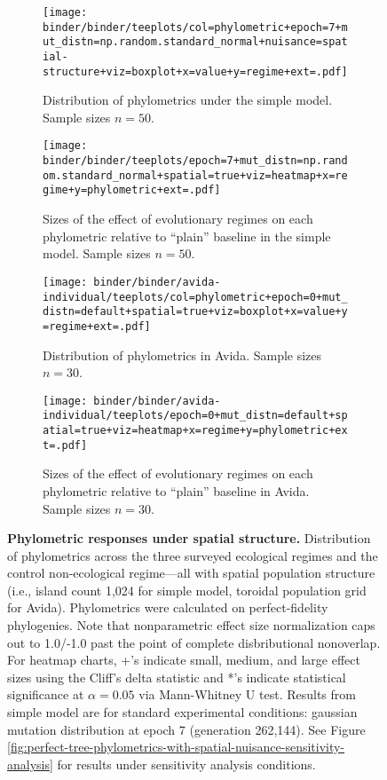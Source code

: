 \begin{figure*}
  \centering
\begin{subfigure}[b]{\textwidth}
  \texttt{[image: binder/binder/teeplots/col=phylometric+epoch=7+mut\_distn=np.random.standard\_normal+nuisance=spatial-structure+viz=boxplot+x=value+y=regime+ext=.pdf]}
  \caption{ Distribution of phylometrics under the simple model.
    Sample sizes $n=50$.}
\end{subfigure}

\begin{subfigure}[b]{\textwidth}
  \texttt{[image: binder/binder/teeplots/epoch=7+mut\_distn=np.random.standard\_normal+spatial=true+viz=heatmap+x=regime+y=phylometric+ext=.pdf]}
  \caption{Sizes of the effect of evolutionary regimes on each phylometric relative to ``plain'' baseline in the simple model.
    Sample sizes $n=50$.}
\end{subfigure}

\begin{subfigure}[b]{\textwidth}
  \texttt{[image: binder/binder/avida-individual/teeplots/col=phylometric+epoch=0+mut\_distn=default+spatial=true+viz=boxplot+x=value+y=regime+ext=.pdf]}
  \caption{ Distribution of phylometrics in Avida.
  Sample sizes $n=30$.}
\end{subfigure}%

\begin{subfigure}[b]{\textwidth}
  \texttt{[image: binder/binder/avida-individual/teeplots/epoch=0+mut\_distn=default+spatial=true+viz=heatmap+x=regime+y=phylometric+ext=.pdf]}
\caption{%
Sizes of the effect of evolutionary regimes on each phylometric relative to ``plain'' baseline in Avida.
    Sample sizes $n=30$.
}
\end{subfigure}
\vspace{1cm}


  \caption{%
    \textbf{Phylometric responses under spatial structure.}
    Distribution of phylometrics across the three surveyed ecological regimes and the control non-ecological regime---all with spatial population structure (i.e., island count 1,024 for simple model, toroidal population grid for Avida).
    Phylometrics were calculated on perfect-fidelity phylogenies.
    Note that nonparametric effect size normalization caps out to 1.0/-1.0 past the point of complete disbributional nonoverlap.
    For heatmap charts, +'s indicate small, medium, and large effect sizes using the Cliff's delta statistic and *'s indicate statistical significance at $\alpha = 0.05$ via Mann-Whitney U test.
    Results from simple model are for standard experimental conditions: gaussian mutation distribution at epoch 7 (generation 262,144).
    See Figure \ref{fig:perfect-tree-phylometrics-with-spatial-nuisance-sensitivity-analysis} for results under sensitivity analysis conditions.
  }
  \label{fig:perfect-tree-phylometrics-with-spatial-nuisance}
\end{figure*}
